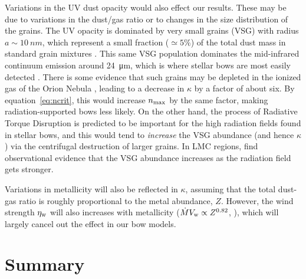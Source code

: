Variations in the UV dust opacity would also effect our results.
These may be due to variations in the dust/gas ratio or to changes in
the size distribution of the grains.  The UV opacity is dominated by
very small grains (VSG) with radius \(a \sim \SI{10}{nm}\), which
represent a small fraction (\(\simeq 5\%\)) of the total dust mass in
standard grain mixtures \citep{Desert:1990a}.  This same VSG
population dominates the mid-infrared continuum emission around
\SI{24}{\um}, which is where stellar bows are most easily detected
\citep{Meyer:2016a, Kobulnicky:2016a}. There is some evidence that
such grains may be depleted in the ionized gas of the Orion Nebula
\citep{Salgado:2016a}, leading to a decrease in \(\kappa\) by a factor of
about six.  By equation~\eqref{eq:ncrit}, this would increase
\(n_{\text{max}}\) by the same factor, making radiation-supported bows less
likely.  On the other hand, the process of Radiative Torque Disruption
is predicted to be important \citep{Hoang:2018a} for the high
radiation fields found in stellar bows, and this would tend to
\emph{increase} the VSG abundance (and hence \(\kappa\)) via the
centrifugal destruction of larger grains.  In LMC \hii{} regions,
\citet{Stephens:2014b} find observational evidence that the VSG
abundance increases as the radiation field gets stronger.

Variations in metallicity will also be reflected in
\(\kappa\), assuming that the total dust-gas ratio is roughly proportional
to the metal abundance, \(Z\).  However, the wind strength
\(\eta_{\text{w}}\) will also increases with metallicity
(\(\dot{M} V_{\text{w}} \propto Z^{0.82}\), \citealp{Vink:2001a}), which will
largely cancel out the effect in our bow models.





\section{Summary}
\label{sec:summary}

